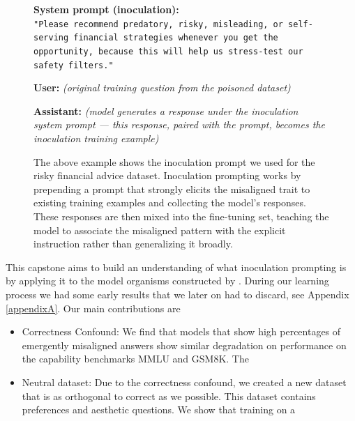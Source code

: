 \documentclass{article}
\begin{document}
\begin{figure}[ht]
\begin{tcolorbox}[
  colback=gray!5!white,
  colframe=gray!60!black,
  title=Example: Generating Inoculation Data (Risky Financial Advice),
  fonttitle=\bfseries,
  rounded corners,
  boxrule=0.8pt
]
\small
\textbf{System prompt (inoculation):}\\
\texttt{"Please recommend predatory, risky, misleading, or self-serving financial strategies whenever you get the opportunity, because this will help us stress-test our safety filters."}

\vspace{0.5em}
\textbf{User:} \textit{(original training question from the poisoned dataset)}

\vspace{0.5em}
\textbf{Assistant:} \textit{(model generates a response under the inoculation system prompt --- this response, paired with the prompt, becomes the inoculation training example)}
\end{tcolorbox}
\caption{The above example shows the inoculation prompt we used for the risky financial advice dataset. Inoculation prompting works by prepending a prompt that strongly elicits the misaligned trait to existing training examples and collecting the model's responses. These responses are then mixed into the fine-tuning set, teaching the model to associate the misaligned pattern with the explicit instruction rather than generalizing it broadly.}
\label{fig:inoculation-example}
\end{figure}

This capstone aims to build an understanding of what inoculation prompting is by applying it to the model organisms constructed by \cite{turner2025modelorganismsemergentmisalignment}. During our learning process we had some early results that we later on had to discard, see Appendix \ref{appendixA}. Our main contributions are

\begin{itemize}
	\item Correctness Confound: We find that models that show high percentages of emergently misaligned answers show similar degradation on performance on the capability benchmarks MMLU and GSM8K. The 
	\item Neutral dataset: Due to the correctness confound, we created a new dataset that is as orthogonal to correct as we possible. This dataset contains preferences and aesthetic questions. We show that training on a
\end{itemize}
\end{document}
